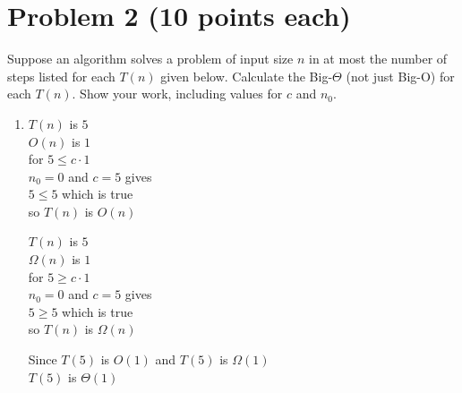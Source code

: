 \documentclass[11pt]{article}
\begin{document}
\section*{Problem 2 (10 points each)}
Suppose an algorithm solves a problem of input size $n$ in at most the number
      of steps listed for each $T(n)$ given below. Calculate the Big-$\Theta$ (not
      just Big-O) for each $T(n)$. Show your work, including values for $c$ and
      $n_0$.
      \begin{enumerate}[label=(\arabic*)\setlength{\listparindent}{\parindent}]
 
\item 
$T(n)$ is $5$\\ 
\vspace{5pt} 
{$O(n)$ is $1$\\
\vspace{5pt} 
for $5 \leq c \cdot 1$\\
\vspace{5pt} 
 $n_{0} = 0$ and $c = 5$ gives  \\
\vspace{5pt} 
$5 \leq 5$ which is true \\
\vspace{5pt} 
so $T(n)$ is $O(n)$}\\
\begin{center}
\vspace{-130pt}
$T(n)$ is $5$\\ 
\vspace{5pt} 
$\Omega(n)$ is $1$\\
\vspace{5pt} 
for $5 \geq c \cdot 1$\\
\vspace{5pt} 
$n_{0} = 0$ and $c = 5$ gives  \\
\vspace{5pt} 
$5 \geq 5$ which is true \\
\vspace{5pt} 
so $T(n)$ is $\Omega(n)$
\end{center}
Since $T(5)$ is $O(1)$ and $T(5)$ is $\Omega(1)$ \\
\vspace{5pt}
$T(5)$ is $\Theta(1)$

\pagebreak


\end{enumerate}
\end{document}

